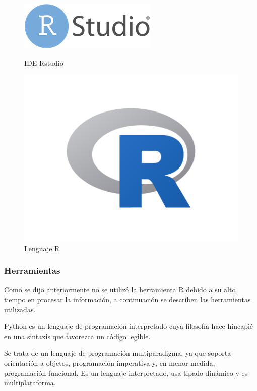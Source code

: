\documentclass[12pt]{article}
\newcounter{subsubsubsection}[subsubsection]
\begin{document}
\clearpage

\begin{figure}[!htb]
   \begin{minipage}{0.48\textwidth}
     \centering
     \includegraphics[width=.7\linewidth]{rstudio}
     \caption{IDE Rstudio}
     \label{Fig:RSTUDIO}
   \end{minipage}\hfill
   \begin {minipage}{0.48\textwidth}
     \centering
     \includegraphics[width=.7\linewidth]{r}
     \caption{Lenguaje R}
     \label{Fig:R}
   \end{minipage}
\end{figure}

\subsubsection{Herramientas}
Como se dijo anteriormente no se utilizó la herramienta R debido a su alto tiempo en procesar la información, a continuación se describen las herramientas utilizadas.

Python es un lenguaje de programación interpretado cuya filosofía hace hincapié en una sintaxis que favorezca un código legible.

Se trata de un lenguaje de programación multiparadigma, ya que soporta orientación a objetos, programación imperativa y, en menor medida, programación funcional. Es un lenguaje interpretado, usa tipado dinámico y es multiplataforma.
\end{document}
